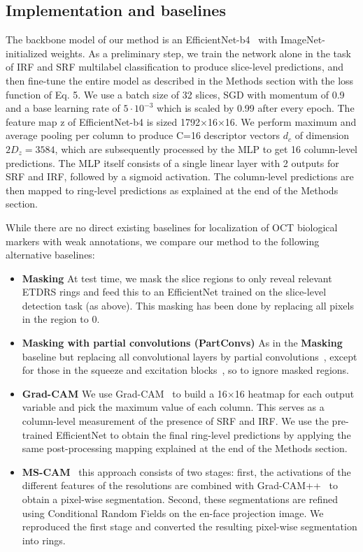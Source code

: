 \subsection{Implementation and baselines}
The backbone model of our method is an EfficientNet-b4~ with ImageNet-initialized weights. As a preliminary step, we train the network alone in the task of IRF and SRF multilabel classification to produce slice-level predictions, and then fine-tune the entire model as described in the Methods section with the loss function of Eq. 5. We use a batch size of 32 slices, SGD with momentum of 0.9 and a base learning rate of $5\cdot10^{-3}$ which is scaled by 0.99 after every epoch. The feature map z of EfficientNet-b4 is sized 1792×16×16. We perform maximum and average pooling per column to produce C=16 descriptor vectors $d_c$ of dimension $2D_z=3584$, which are subsequently processed by the MLP to get 16 column-level predictions. The MLP itself consists of a single linear layer with 2 outputs for SRF and IRF, followed by a sigmoid activation. The column-level predictions are then mapped to ring-level predictions as explained at the end of the Methods section.

While there are no direct existing baselines for localization of OCT biological markers with weak annotations, we compare our method to the following alternative baselines:
\begin{itemize}
    \item \textbf{Masking} At test time, we mask the slice regions to only reveal relevant ETDRS rings and feed this to an EfficientNet trained on the slice-level detection task (as above). This masking has been done by replacing all pixels in the region to 0.
    
    \item \textbf{Masking with partial convolutions (PartConvs)} As in the \textbf{Masking} baseline but replacing all convolutional layers by partial convolutions~, except for those in the squeeze and excitation blocks~, so to ignore masked regions.
    
    \item \textbf{Grad-CAM} We use Grad-CAM~ to build a 16×16 heatmap for each output variable and pick the maximum value of each column. This serves as a column-level measurement of the presence of SRF and IRF. We use the pre-trained EfficientNet to obtain the final ring-level predictions by applying the same post-processing mapping explained at the end of the Methods section.

    \item \textbf{MS-CAM}~ this approach consists of two stages: first, the activations of the different features of the resolutions are combined with Grad-CAM++~ to obtain a pixel-wise segmentation. Second, these segmentations are refined using Conditional Random Fields on the en-face projection image. We reproduced the first stage and converted the resulting pixel-wise segmentation into rings. 
\end{itemize}

